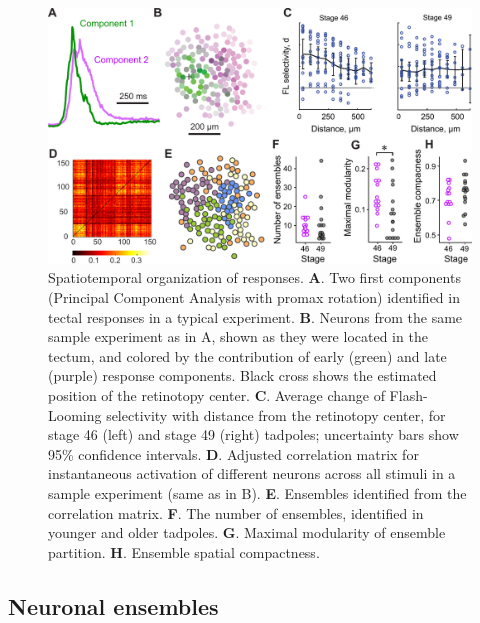 \documentclass{article}
\begin{document}
\begin{figure}[t!]
\includegraphics[width=\linewidth]{fig3.pdf}
\caption{
Spatiotemporal organization of responses. \textbf{A}. Two first components (Principal Component Analysis with promax rotation) identified in tectal responses in a typical experiment.  \textbf{B}. Neurons from the same sample experiment as in A, shown as they were located in the tectum, and colored by the contribution of early (green) and late (purple) response components. Black cross shows the estimated position of the retinotopy center. \textbf{C}. Average change of Flash-Looming selectivity with distance from the retinotopy center, for stage 46 (left) and stage 49 (right) tadpoles; uncertainty bars show 95\% confidence intervals. \textbf{D}. Adjusted correlation matrix for instantaneous activation of different neurons across all stimuli in a sample experiment (same as in B). \textbf{E}. Ensembles identified from the correlation matrix. \textbf{F}. The number of ensembles, identified in younger and older tadpoles. \textbf{G}. Maximal modularity of ensemble partition. \textbf{H}. Ensemble spatial compactness.}
\end{figure}

\subsection*{Neuronal ensembles}
\end{document}
